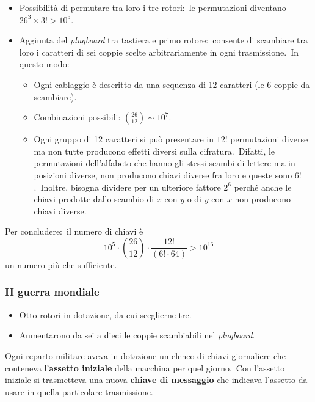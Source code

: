 \begin{itemize}
    \item Possibilità di permutare tra loro i tre rotori:\ le permutazioni diventano $26^3 \times 3! > 10^5$.
    \item Aggiunta del \textit{plugboard} tra tastiera e primo rotore:\ consente di scambiare tra loro i caratteri di sei coppie scelte arbitrariamente in ogni trasmissione.\ In questo modo:
          \begin{itemize}
              \item Ogni cablaggio è descritto da una sequenza di 12 caratteri (le 6 coppie da scambiare).
              \item Combinazioni possibili: $\binom{26}{12}\sim 10^7$.
              \item Ogni gruppo di 12 caratteri si può presentare in $12!$ permutazioni diverse ma non tutte producono effetti diversi sulla cifratura.\ Difatti, le permutazioni dell'alfabeto che hanno gli stessi scambi di lettere ma in posizioni diverse, non producono chiavi diverse fra loro e queste sono $6!$.\ Inoltre, bisogna dividere per un ulteriore fattore $2^6$ perché anche le chiavi prodotte dallo scambio di $x$ con $y$ o di $y$ con $x$ non producono chiavi diverse.\
          \end{itemize}
\end{itemize}

\noindent Per concludere:\ il numero di chiavi è
\[10^5 \cdot \binom{26}{12} \cdot \frac{12!}{(6!\cdot 64)} > 10^{16}\]
un numero più che sufficiente.\

\subsubsection{II guerra mondiale}

\begin{itemize}
    \item Otto rotori in dotazione, da cui sceglierne tre.
    \item Aumentarono da sei a dieci le coppie scambiabili nel \textit{plugboard}.
\end{itemize}

\noindent Ogni reparto militare aveva in dotazione un elenco di chiavi giornaliere che conteneva l'\textbf{assetto iniziale} della macchina per quel giorno.\
Con l'assetto iniziale si trasmetteva una nuova \textbf{chiave di messaggio} che indicava l'assetto da usare in quella particolare trasmissione.
